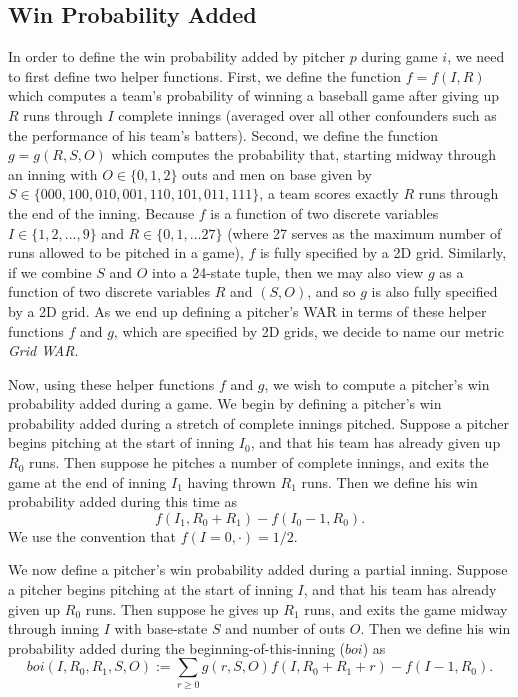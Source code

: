 \documentclass[12pt]{article}
\begin{document}
\subsection{Win Probability Added}

In order to define the win probability added by pitcher $p$ during game $i$, we need to first define two helper functions. First, we define the function $f = f(I,R)$ which computes a team's probability of winning a baseball game after giving up $R$ runs through $I$ complete innings (averaged over all other confounders such as the performance of his team's batters). Second, we define the function $g = g(R,S,O)$ which computes the probability that, starting midway through an inning with $O \in \{0,1,2\}$ outs and men on base given by $S \in \{000,100,010,001,110,101,011,111\}$, a team scores exactly $R$ runs through the end of the inning. Because $f$ is a function of two discrete variables $I \in \{1,2,...,9\}$ and $R \in \{0,1,...27\}$ (where 27 serves as the maximum number of runs allowed to be pitched in a game), $f$ is fully specified by a 2D grid. Similarly, if we combine $S$ and $O$ into a 24-state tuple, then we may also view $g$ as a function of two discrete variables $R$ and $(S,O)$, and so $g$ is also fully specified by a 2D grid. As we end up defining a pitcher's WAR in terms of these helper functions $f$ and $g$, which are specified by 2D grids, we decide to name our metric \textit{Grid WAR}. 

Now, using these helper functions $f$ and $g$, we wish to compute a pitcher's win probability added during a game. We begin by defining a pitcher's win probability added during a stretch of complete innings pitched. Suppose a pitcher begins pitching at the start of inning $I_0$, and that his team has already given up $R_0$ runs. Then suppose he pitches a number of complete innings, and exits the game at the end of inning $I_1$ having thrown $R_1$ runs. Then we define his win probability added during this time as
$$f(I_1, R_0+R_1) - f(I_0 - 1, R_0).$$
We use the convention that $f(I=0,\cdot) = 1/2$.

We now define a pitcher's win probability added during a partial inning.  Suppose a pitcher begins pitching at the start of inning $I$, and that his team has already given up $R_0$ runs.  Then suppose he gives up $R_1$ runs, and exits the game midway through inning $I$ with base-state $S$ and number of outs $O$. Then we define his win probability added during the beginning-of-this-inning ($boi$) as
$$boi(I,R_0,R_1,S,O) := \sum_{r \geq 0} g(r,S,O) f(I,R_0+R_1+r)   - f(I-1,R_0).$$
\end{document}
